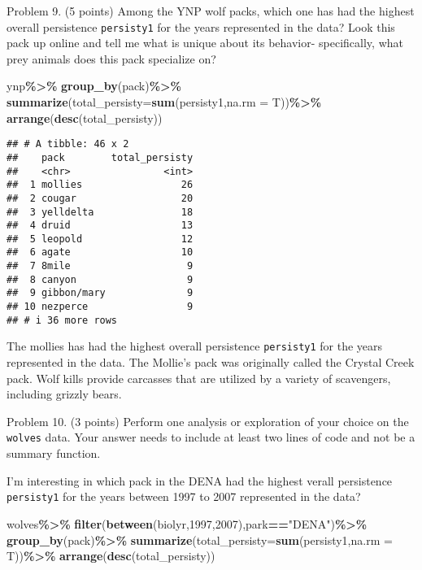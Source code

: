 \documentclass[
]{article}
\newenvironment{Shaded}{\begin{snugshade}}{\end{snugshade}}
\newcommand{\AttributeTok}[1]{\textcolor[rgb]{0.13,0.29,0.53}{#1}}
\newcommand{\DecValTok}[1]{\textcolor[rgb]{0.00,0.00,0.81}{#1}}
\newcommand{\FunctionTok}[1]{\textcolor[rgb]{0.13,0.29,0.53}{\textbf{#1}}}
\newcommand{\NormalTok}[1]{#1}
\newcommand{\SpecialCharTok}[1]{\textcolor[rgb]{0.81,0.36,0.00}{\textbf{#1}}}
\newcommand{\StringTok}[1]{\textcolor[rgb]{0.31,0.60,0.02}{#1}}
\begin{document}
Problem 9. (5 points) Among the YNP wolf packs, which one has had the
highest overall persistence \texttt{persisty1} for the years represented
in the data? Look this pack up online and tell me what is unique about
its behavior- specifically, what prey animals does this pack specialize
on?

\begin{Shaded}
\begin{Highlighting}[]
\NormalTok{ynp}\SpecialCharTok{\%\textgreater{}\%}
  \FunctionTok{group\_by}\NormalTok{(pack)}\SpecialCharTok{\%\textgreater{}\%}
  \FunctionTok{summarize}\NormalTok{(}\AttributeTok{total\_persisty=}\FunctionTok{sum}\NormalTok{(persisty1,}\AttributeTok{na.rm =}\NormalTok{ T))}\SpecialCharTok{\%\textgreater{}\%}
  \FunctionTok{arrange}\NormalTok{(}\FunctionTok{desc}\NormalTok{(total\_persisty))}
\end{Highlighting}
\end{Shaded}

\begin{verbatim}
## # A tibble: 46 x 2
##    pack        total_persisty
##    <chr>                <int>
##  1 mollies                 26
##  2 cougar                  20
##  3 yelldelta               18
##  4 druid                   13
##  5 leopold                 12
##  6 agate                   10
##  7 8mile                    9
##  8 canyon                   9
##  9 gibbon/mary              9
## 10 nezperce                 9
## # i 36 more rows
\end{verbatim}

The mollies has had the highest overall persistence \texttt{persisty1}
for the years represented in the data. The Mollie's pack was originally
called the Crystal Creek pack. Wolf kills provide carcasses that are
utilized by a variety of scavengers, including grizzly bears.

Problem 10. (3 points) Perform one analysis or exploration of your
choice on the \texttt{wolves} data. Your answer needs to include at
least two lines of code and not be a summary function.

I'm interesting in which pack in the DENA had the highest verall
persistence \texttt{persisty1} for the years between 1997 to 2007
represented in the data?

\begin{Shaded}
\begin{Highlighting}[]
\NormalTok{wolves}\SpecialCharTok{\%\textgreater{}\%}
  \FunctionTok{filter}\NormalTok{(}\FunctionTok{between}\NormalTok{(biolyr,}\DecValTok{1997}\NormalTok{,}\DecValTok{2007}\NormalTok{),park}\SpecialCharTok{==}\StringTok{"DENA"}\NormalTok{)}\SpecialCharTok{\%\textgreater{}\%}
  \FunctionTok{group\_by}\NormalTok{(pack)}\SpecialCharTok{\%\textgreater{}\%}
  \FunctionTok{summarize}\NormalTok{(}\AttributeTok{total\_persisty=}\FunctionTok{sum}\NormalTok{(persisty1,}\AttributeTok{na.rm =}\NormalTok{ T))}\SpecialCharTok{\%\textgreater{}\%}
  \FunctionTok{arrange}\NormalTok{(}\FunctionTok{desc}\NormalTok{(total\_persisty))}
\end{Highlighting}
\end{Shaded}
\end{document}
